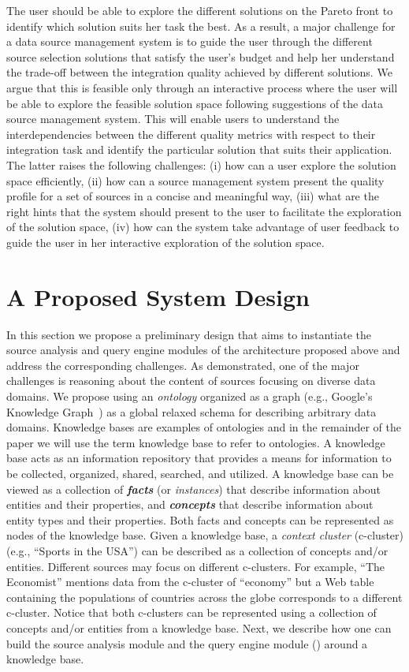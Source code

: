\documentclass{sig-alternate}
\begin{document}
The user should be able to explore the different solutions on the Pareto front to identify which solution suits her task the best.  As a result, a major challenge for a data source management system is to guide the user through the different source selection solutions that satisfy the user's budget and help her understand the trade-off between the integration quality achieved by different solutions. We argue that this is feasible only through an interactive process where the user will be able to explore the feasible solution space following suggestions of the data source management system. This will enable users to understand the interdependencies between the different quality metrics with respect to their integration task and identify the particular solution that suits their application. The latter raises the following challenges: (i) how can a user explore the solution space efficiently, (ii) how can a source management system present the quality profile for a set of sources in a concise and meaningful way, (iii) what are the right hints that the system should present to the user to facilitate the exploration of the solution space, (iv) how can the system take advantage of user feedback to guide the user in her interactive exploration of the solution space. 

\section{A Proposed System Design}
\label{sec:corgraph}
In this section we propose a preliminary design that aims to instantiate the source analysis and query engine modules of the architecture proposed above and address the corresponding challenges. As demonstrated, one of the major challenges is reasoning about the content of sources focusing on diverse data domains. We propose using an {\em ontology} organized as a graph (e.g., Google's Knowledge Graph~\cite{kg}) as a global relaxed schema for describing arbitrary data domains. Knowledge bases are examples of ontologies and in the remainder of the paper we will use the term knowledge base to refer to ontologies. A knowledge base acts as an information repository that provides a means for information to be collected, organized, shared, searched, and utilized. A knowledge base can be viewed as a collection of {\bf {\em facts}} (or {\em instances}) that describe information about entities and their properties, and {\bf {\em concepts}} that describe information about entity types and their properties. Both facts and concepts can be represented as nodes of the knowledge base. Given a knowledge base, a {\em context cluster} (c-cluster) (e.g., ``Sports in the USA'') can be described as a collection of concepts and/or entities. Different sources may focus on different c-clusters. For example, ``The Economist'' mentions data from the c-cluster of  ``economy'' but a Web table containing the populations of countries across the globe corresponds to a different c-cluster. Notice that both c-clusters can be represented using a collection of concepts and/or entities from a knowledge base.  Next, we describe how one can build the source analysis module and the query engine module () around a knowledge base.
\end{document}
